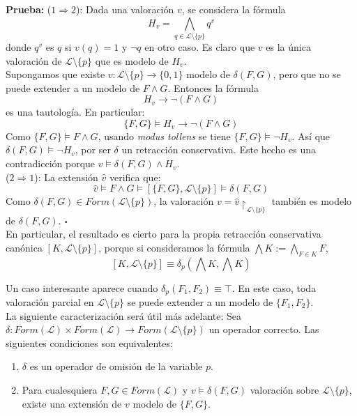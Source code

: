 \noindent \textbf{Prueba: } ($1 \Rightarrow 2$): Dada una valoración $v$, se considera la fórmula 
$$H_v = \bigwedge_{q \in \mathcal{L} \setminus \{ p \}} q^v$$
donde $q^v$ es $q$ si $v(q)=1$ y $\neg q$ en otro caso. Es claro que $v$ es la única valoración de $\mathcal{L} \setminus \{ p \}$ que es modelo de $H_v$. \\
Supongamos que existe $v  :\mathcal{L} \setminus \{p\} \rightarrow \{ 0,1 \}$ modelo de $\delta (F,G)$, pero que no se puede extender a un modelo de $F \wedge G$. Entonces la fórmula $$H_v \rightarrow \neg (F \wedge G)$$ es una tautología. En particular:
$$ \{ F,G \} \vDash H_v \rightarrow \neg (F \wedge G)$$
Como $ \{ F,G \} \vDash F \wedge G$, usando \textit{modus tollens} se tiene $\{ F,G \} \vDash \neg H_v$. Así que $\delta (F,G) \vDash \neg H_v$, por ser $\delta$ un retracción conservativa. Este hecho es una contradicción porque $v \vDash \delta (F,G) \wedge H_v$.\\
($2 \Rightarrow 1$): La extensión $\hat{v}$ verifica que:
$$\hat{v} \vDash F \wedge G \vDash [\{ F,G \} , \mathcal{L} \setminus \{ p \} ] \vDash \delta (F,G)$$
Como $\delta (F,G) \in Form(\mathcal{L} \setminus \{ p \})$, la valoración $v = \hat{v} \upharpoonright_{\mathcal{L} \setminus \{ p \}}$ también es modelo de $\delta (F,G)$. \hspace{14cm} $\square$ \\

En particular, el resultado es cierto para la propia retracción conservativa canónica $[K, \mathcal{L} \setminus \{ p \}]$, porque si consideramos la fórmula $\bigwedge K := \bigwedge_{F \in K} F$,
$$[K, \mathcal{L} \setminus \{ p \}] \equiv \delta_p (\bigwedge K , \bigwedge K)$$

Un caso interesante aparece cuando $\delta_p(F_1,F_2) \equiv \top$. En este caso, toda valoración parcial en $\mathcal{L} \setminus \{ p \}$ se puede extender a un modelo de $\{ F_1,F_2 \}$.\\

La siguiente caracterización será útil más adelante:
\cor \label{cor:robusto} Sea $\delta : Form(\mathcal{L}) \times Form(\mathcal{L}) \longrightarrow Form(\mathcal{L} \setminus \{ p \})$ un operador correcto. Las siguientes condiciones son equivalentes:
\begin{enumerate}
\item $\delta$ es un operador de omisión de la variable $p$.
\item Para cualesquiera $F,G \in Form(\mathcal{L})$ y $v \vDash \delta (F,G) $ valoración sobre $\mathcal{L} \setminus \{ p \}$, existe una extensión de $v$ modelo de $\{ F,G \}$.
\end{enumerate}

